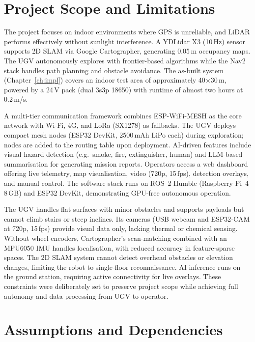 \section{Project Scope and Limitations}
\label{sec:scope}

The project focuses on indoor environments where GPS is unreliable, and LiDAR performs effectively without sunlight interference. A YDLidar X3 (10\,Hz) sensor supports 2D SLAM via Google Cartographer, generating 0.05\,m occupancy maps. The UGV autonomously explores with frontier-based algorithms while the Nav2 stack handles path planning and obstacle avoidance. The as-built system (Chapter~\ref{ch:impl}) covers an indoor test area of approximately 40$\times$30\,m, powered by a 24\,V pack (dual 3s3p 18650) with runtime of almost two hours at 0.2\,m/s.

A multi-tier communication framework combines ESP-WiFi-MESH as the core network with Wi-Fi, 4G, and LoRa (SX1278) as fallbacks. The UGV deploys compact mesh nodes (ESP32 DevKit, 2500\,mAh LiPo each) during exploration; nodes are added to the routing table upon deployment. AI-driven features include visual hazard detection (e.g.\ smoke, fire, extinguisher, human) and LLM-based summarisation for generating mission reports. Operators access a web dashboard offering live telemetry, map visualisation, video (720p, 15\,fps), detection overlays, and manual control. The software stack runs on ROS~2 Humble (Raspberry Pi~4 8\,GB) and ESP32 DevKit, demonstrating GPU-free autonomous operation.

The UGV handles flat surfaces with minor obstacles and supports payloads but cannot climb stairs or steep inclines. Its cameras (USB webcam and ESP32-CAM at 720p, 15\,fps) provide visual data only, lacking thermal or chemical sensing. Without wheel encoders, Cartographer's scan-matching combined with an MPU6050 IMU handles localisation, with reduced accuracy in feature-sparse spaces. The 2D SLAM system cannot detect overhead obstacles or elevation changes, limiting the robot to single-floor reconnaissance. AI inference runs on the ground station, requiring active connectivity for live overlays. These constraints were deliberately set to preserve project scope while achieving full autonomy and data processing from UGV to operator.

\section{Assumptions and Dependencies}
\label{sec:assumptions}

